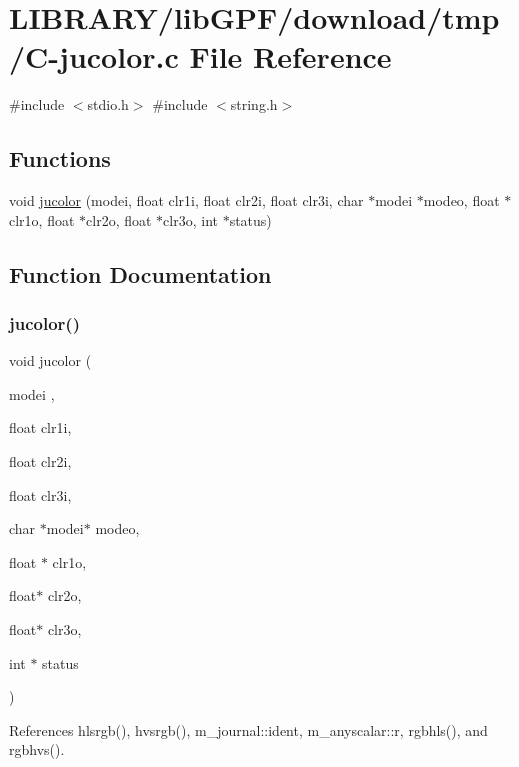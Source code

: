 \hypertarget{C-jucolor_8c}{}\section{L\+I\+B\+R\+A\+R\+Y/lib\+G\+P\+F/download/tmp/\+C-\/jucolor.c File Reference}
\label{C-jucolor_8c}
{\ttfamily \#include $<$stdio.\+h$>$}\newline
{\ttfamily \#include $<$string.\+h$>$}\newline
\subsection*{Functions}
\begin{DoxyCompactItemize}
\item 
void \hyperlink{C-jucolor_8c_ab1a7b686c79343455799a5c44294194b}{jucolor} (modei, float clr1i, float clr2i, float clr3i, char $\ast$modei $\ast$modeo, float $\ast$clr1o, float $\ast$clr2o, float $\ast$clr3o, int $\ast$status)
\end{DoxyCompactItemize}


\subsection{Function Documentation}
\mbox{\label{C-jucolor_8c_ab1a7b686c79343455799a5c44294194b}} 
\subsubsection{\texorpdfstring{jucolor()}{jucolor()}}
{\footnotesize\ttfamily void jucolor (\begin{DoxyParamCaption}\item[{modei}]{,  }\item[{float}]{clr1i,  }\item[{float}]{clr2i,  }\item[{float}]{clr3i,  }\item[{char $\ast$modei$\ast$}]{modeo,  }\item[{float $\ast$}]{clr1o,  }\item[{float$\ast$}]{clr2o,  }\item[{float$\ast$}]{clr3o,  }\item[{int $\ast$}]{status }\end{DoxyParamCaption})}



References hlsrgb(), hvsrgb(), m\+\_\+journal\+::ident, m\+\_\+anyscalar\+::r, rgbhls(), and rgbhvs().

